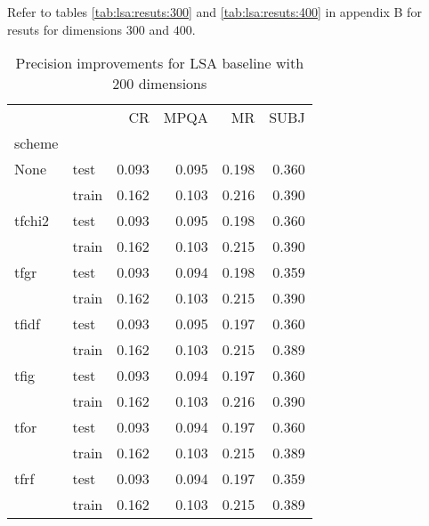     Refer to tables \ref{tab:lsa:resuts:300} and \ref{tab:lsa:resuts:400} in appendix B for resuts for dimensions $300$ and $400$.
    
\begin{table}[H]
\begin{center}

\begin{tabular}{llrrrr}
\toprule
{} &      &  CR &  MPQA &  MR &  SUBJ \\
scheme &  &            &              &            &              \\
\midrule
None & test &      0.093 &        0.095 &      0.198 &        0.360 \\
{} & train &      0.162 &        0.103 &      0.216 &        0.390 \\
tfchi2 & test &      0.093 &        0.095 &      0.198 &        0.360 \\
{} & train &      0.162 &        0.103 &      0.215 &        0.390 \\
tfgr & test &      0.093 &        0.094 &      0.198 &        0.359 \\
{} & train &      0.162 &        0.103 &      0.215 &        0.390 \\
tfidf & test &      0.093 &        0.095 &      0.197 &        0.360 \\
{} & train &      0.162 &        0.103 &      0.215 &        0.389 \\
tfig & test &      0.093 &        0.094 &      0.197 &        0.360 \\
{} & train &      0.162 &        0.103 &      0.216 &        0.390 \\
tfor & test &      0.093 &        0.094 &      0.197 &        0.360 \\
{} & train &      0.162 &        0.103 &      0.215 &        0.389 \\
tfrf & test &      0.093 &        0.094 &      0.197 &        0.359 \\
{} & train &      0.162 &        0.103 &      0.215 &        0.389 \\
\bottomrule
\end{tabular}

\caption[Precision improvements for LSA baseline with 200 dimensions]{Precision improvements for LSA baseline with 200 dimensions}
\label{tab:}
\end{center}
\end{table}

    
